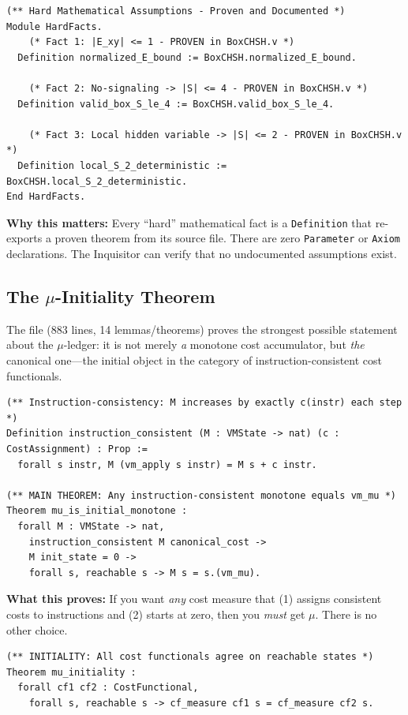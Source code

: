 \begin{lstlisting}
(** Hard Mathematical Assumptions - Proven and Documented *)
Module HardFacts.
    (* Fact 1: |E_xy| <= 1 - PROVEN in BoxCHSH.v *)
  Definition normalized_E_bound := BoxCHSH.normalized_E_bound.

    (* Fact 2: No-signaling -> |S| <= 4 - PROVEN in BoxCHSH.v *)
  Definition valid_box_S_le_4 := BoxCHSH.valid_box_S_le_4.

    (* Fact 3: Local hidden variable -> |S| <= 2 - PROVEN in BoxCHSH.v *)
  Definition local_S_2_deterministic := BoxCHSH.local_S_2_deterministic.
End HardFacts.
\end{lstlisting}

\textbf{Why this matters:} Every ``hard'' mathematical fact is a \texttt{Definition} that re-exports a proven theorem from its source file. There are zero \texttt{Parameter} or \texttt{Axiom} declarations. The Inquisitor can verify that no undocumented assumptions exist.

\subsection{The $\mu$-Initiality Theorem}

The file  (883 lines, 14 lemmas/theorems) proves the strongest possible statement about the $\mu$-ledger: it is not merely \textit{a} monotone cost accumulator, but \textit{the} canonical one—the initial object in the category of instruction-consistent cost functionals.

\begin{lstlisting}
(** Instruction-consistency: M increases by exactly c(instr) each step *)
Definition instruction_consistent (M : VMState -> nat) (c : CostAssignment) : Prop :=
  forall s instr, M (vm_apply s instr) = M s + c instr.

(** MAIN THEOREM: Any instruction-consistent monotone equals vm_mu *)
Theorem mu_is_initial_monotone :
  forall M : VMState -> nat,
    instruction_consistent M canonical_cost ->
    M init_state = 0 ->
    forall s, reachable s -> M s = s.(vm_mu).
\end{lstlisting}

\textbf{What this proves:} If you want \textit{any} cost measure that (1) assigns consistent costs to instructions and (2) starts at zero, then you \textit{must} get $\mu$. There is no other choice.

\begin{lstlisting}
(** INITIALITY: All cost functionals agree on reachable states *)
Theorem mu_initiality :
  forall cf1 cf2 : CostFunctional,
    forall s, reachable s -> cf_measure cf1 s = cf_measure cf2 s.
\end{lstlisting}


